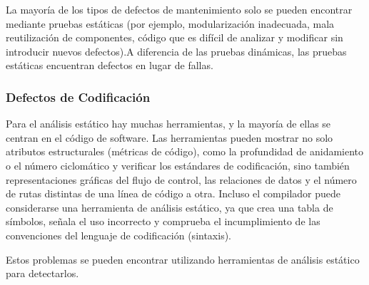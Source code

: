 La mayoría de los tipos de defectos de mantenimiento solo se pueden encontrar mediante pruebas estáticas (por ejemplo, modularización inadecuada, mala reutilización de componentes, código que es difícil de analizar y modificar sin introducir nuevos defectos).A diferencia de las pruebas dinámicas, las pruebas estáticas encuentran defectos en lugar de fallas.\\

\subsubsection {Defectos de Codificación}

Para el análisis estático hay muchas herramientas, y la mayoría de ellas se centran en el código de software. Las herramientas pueden mostrar no solo atributos estructurales (métricas de código), como la profundidad de anidamiento o el número ciclomático y verificar los estándares de codificación, sino también representaciones gráficas del flujo de control, las relaciones de datos y el número de rutas distintas de una línea de código a otra. Incluso el compilador puede considerarse una herramienta de análisis estático, ya que crea una tabla de símbolos, señala el uso incorrecto y comprueba el incumplimiento de las convenciones del lenguaje de codificación (sintaxis).

Estos problemas se pueden encontrar utilizando herramientas de análisis estático para detectarlos. 

